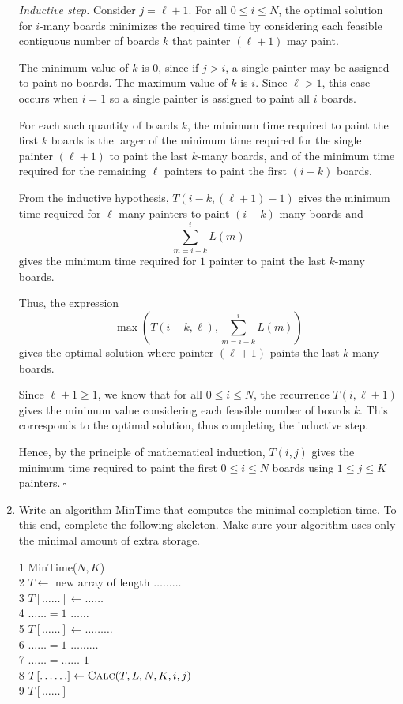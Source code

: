 \begin{enumerate}
\begin{solution}
\textit{Inductive step. }Consider $j=\ell+1$. For all $0\leq i\leq N$, the optimal solution for $i$-many boards minimizes the required time by considering each feasible contiguous number of boards $k$ that painter $(\ell+1)$ may paint.

The minimum value of $k$ is $0$, since if $j>i$, a single painter may be assigned to paint no boards. The maximum value of $k$ is $i$. Since $\ell>1$, this case occurs when $i=1$ so a single painter is assigned to paint all $i$ boards.

For each such quantity of boards $k$, the minimum time required to paint the first $k$ boards is the larger of the minimum time required for the single painter $(\ell+1)$ to paint the last $k$-many boards, and of the minimum time required for the remaining $\ell$ painters to paint the first $(i-k)$ boards.

From the inductive hypothesis, $T(i-k,(\ell+1)-1)$ gives the minimum time required for $\ell$-many painters to paint $(i-k)$-many boards and \[\sum_{m=i-k}^i{L(m)}\] gives the minimum time required for $1$ painter to paint the last $k$-many boards.

Thus, the expression \[\max\left(T(i-k,\ell),\sum_{m=i-k}^i{L(m)}\right)\] gives the optimal solution where painter $(\ell+1)$ paints the last $k$-many boards.

Since $\ell+1\geq 1$, we know that for all $0\leq i\leq N$, the recurrence $T(i,\ell+1)$ gives the minimum value considering each feasible number of boards $k$. This corresponds to the optimal solution, thus completing the inductive step.

Hence, by the principle of mathematical induction, $T(i,j)$ gives the minimum time required to paint the first $0\leq i\leq N$ boards using $1\leq j\leq K$ painters.$~\square$
\end{solution}
\newpage
    \item Write an algorithm {\sc MinTime} that computes the minimal completion time. To this end, complete the following skeleton. Make sure your algorithm uses only the minimal amount of extra storage.
	
    \begin{code}
        1 {\sc MinTime}($N,K$)\\
        2 \> $T \gets $ new array of length $\ldots\ldots\ldots$ \\
        3 \> $T[\ldots\ldots] \gets \ldots\ldots$ \\
        4 \> \For $\ldots\ldots=1$ \To $\ldots\ldots$ \Do \\
        5 \> \> $T[\ldots\ldots] \gets \ldots\ldots\ldots$ \\
        6 \> \For $\ldots\ldots=1$ \To $\ldots\ldots\ldots$ \Do \\
        7 \> \> \For $\ldots\ldots=\ldots\ldots$ \DownTo $1$ \Do \\
        8 \> \> \>  $T[\ldots\ldots] \gets \text{\sc Calc}(T,L,N,K,i,j)$ \\
        9 \> \Return $T[\ldots\ldots]$
    \end{code}


\end{enumerate}
